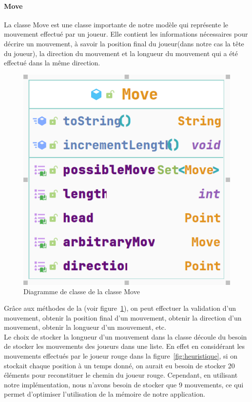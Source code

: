 \tocless\paragraph{Move}
La classe Move est une classe importante de notre modèle qui représente le mouvement effectué par un joueur. Elle contient les 
informations nécessaires pour décrire un mouvement, à savoir la position final du joueur(dans notre cas la tête du joueur), la direction du mouvement et la longueur du mouvement qui a été effectué dans la même direction.
\begin{figure}[ht!]
	\centering
	\includegraphics[scale=0.4]{diagrames/Move}
	\caption{Diagramme de classe de la classe Move}
	\label{fig:move}
\end{figure}
Grâce aux méthodes de la (voir figure~\ref{fig:move}), on peut effectuer la validation d'un mouvement, obtenir la position final d'un mouvement, obtenir la direction d'un mouvement, obtenir la longueur d'un mouvement, etc.\\

Le choix de stocker la longueur d'un mouvement dans la classe   découle du besoin de stocker les mouvements des joueurs dans une liste. 
En effet en considérant les mouvements effectués par le joueur rouge dans la figure~\ref{fig:heuristique},  si on stockait 
chaque position à un temps donné, on aurait eu besoin de stocker 20 éléments pour reconstituer le chemin du joueur rouge. Cependant, en utilisant notre implémentation, nous n'avons 
besoin de stocker que 9 mouvements, ce qui permet d'optimiser l'utilisation de la mémoire de notre application.\\

